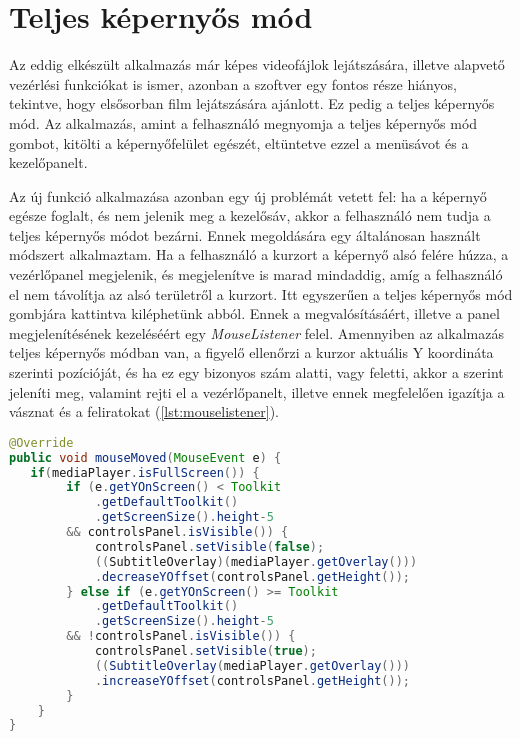 \section{Teljes képernyős mód}

Az eddig elkészült alkalmazás már képes videofájlok lejátszására, illetve alapvető vezérlési funkciókat is ismer, azonban a szoftver egy fontos része hiányos, tekintve, hogy elsősorban film lejátszására ajánlott. Ez pedig a teljes képernyős mód. Az alkalmazás, amint a felhasználó megnyomja a teljes képernyős mód gombot, kitölti a képernyőfelület egészét, eltüntetve ezzel a menüsávot és a kezelőpanelt.

Az új funkció alkalmazása azonban egy új problémát vetett fel: ha a képernyő egésze foglalt, és nem jelenik meg a kezelősáv, akkor a felhasználó nem tudja a teljes képernyős módot bezárni. Ennek megoldására egy általánosan használt módszert alkalmaztam. Ha a felhasználó a kurzort a képernyő alsó felére húzza, a vezérlőpanel megjelenik, és megjelenítve is marad mindaddig, amíg a felhasználó el nem távolítja az alsó területről a kurzort. Itt egyszerűen a teljes képernyős mód gombjára kattintva kiléphetünk abból. Ennek a megvalósításáért, illetve a panel megjelenítésének kezeléséért egy \textit{MouseListener} felel. Amennyiben az alkalmazás teljes képernyős módban van, a figyelő ellenőrzi a kurzor aktuális Y koordináta szerinti pozícióját, és ha ez egy bizonyos szám alatti, vagy feletti, akkor a szerint jeleníti meg, valamint rejti el a vezérlőpanelt, illetve ennek megfelelően igazítja a vásznat és a feliratokat (\ref{lst:mouselistener}).

\begin{spacing}{1.25}
\begin{lstlisting}[caption=A \textit{MouseListener} megvalósítása, label={lst:mouselistener}, language=java]
@Override
public void mouseMoved(MouseEvent e) {
   if(mediaPlayer.isFullScreen()) {
        if (e.getYOnScreen() < Toolkit
            .getDefaultToolkit()
            .getScreenSize().height-5
        && controlsPanel.isVisible()) {
            controlsPanel.setVisible(false);
            ((SubtitleOverlay)(mediaPlayer.getOverlay()))
            .decreaseYOffset(controlsPanel.getHeight());
        } else if (e.getYOnScreen() >= Toolkit
            .getDefaultToolkit()
            .getScreenSize().height-5
        && !controlsPanel.isVisible()) {
            controlsPanel.setVisible(true);
            ((SubtitleOverlay(mediaPlayer.getOverlay()))
            .increaseYOffset(controlsPanel.getHeight());
        }
    }
}
\end{lstlisting}
\end{spacing}

